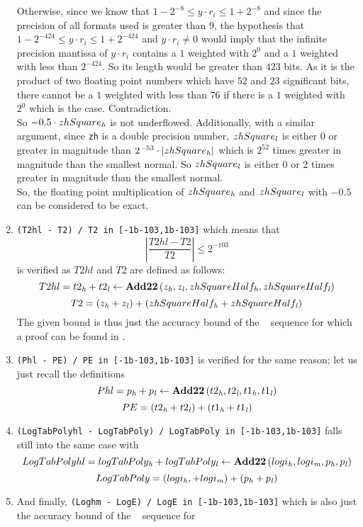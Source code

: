 \begin{enumerate}
Otherwise, since we know that $1 - 2^{-8} \leq y \cdot r_i \leq 1 + 2^{-8}$ and since the precision of all formats used is greater than 
$9$, the hypothesis that $1 - 2^{-424} \leq y \cdot r_i \leq 1 + 2^{-424}$ and $y \cdot r_i \not = 0$ 
would imply that the infinite precision mantissa of 
$y \cdot r_i$ contains a $1$ weighted with $2^0$ and a $1$ weighted with less than $2^{-424}$. So its length would be greater than
$423$ bits. As it is the product of two floating point numbers which have $52$ and $23$ significant bits, there
cannot be a $1$ weighted with less than $76$ if there is a $1$ weighted with $2^0$ which is the case. Contradiction. \\
So $-0.5 \cdot zhSquare_{\mathit{h}}$ is not underflowed. Additionally, with a similar argument, since {\tt zh} is a double precision
number, $zhSquare_{\mathit{l}}$ is either $0$ or greater in magnitude than $2^{-53} \cdot \left \vert zhSquare_{\mathit{h}} \right \vert$ which is
$2^{52}$ times greater in magnitude than the smallest normal. So $zhSquare_{\mathit{l}}$ is either $0$ or $2$ times greater in
magnitude than the smallest normal. \\
So, the floating point multiplication of $zhSquare_{\mathit{h}}$ and $zhSquare_{\mathit{l}}$ with $-0.5$ can be considered to be exact.
\item {\tt (T2hl - T2) / T2 in [-1b-103,1b-103]} which means that 
$$\left \vert \frac{T2hl - T2}{T2} \right \vert \leq 2^{-103}$$ is verified as $T2hl$ and $T2$ are defined as follows:
$$T2hl = t2_{\mathit{h}} + t2_{\mathit{l}} \gets \mathbf{Add22} \left( z_{\mathit{h}}, z_{\mathit{l}}, zhSquareHalf_{\mathit{h}}, zhSquareHalf_{\mathit{l}} \right)$$
$$T2 = \left( z_{\mathit{h}} + z_{\mathit{l}} \right) + \left( zhSquareHalf_{\mathit{h}} + zhSquareHalf_{\mathit{l}} \right)$$
The given bound is thus just the accuracy bound of the \AddDD~ sequence for which a proof can be found in 
\cite{Lau05}.
\item {\tt (Phl - PE) / PE in [-1b-103,1b-103]} is verified for the same reason; let us just recall the definitions
$$Phl = p_{\mathit{h}} + p_{\mathit{l}} \gets \mathbf{Add22} \left( t2_{\mathit{h}}, t2_{\mathit{l}}, t1_{\mathit{h}}, t1_{\mathit{l}} \right)$$
$$PE = \left( t2_{\mathit{h}} + t2_{\mathit{l}}\right) + \left( t1_{\mathit{h}} + t1_{\mathit{l}} \right)$$
\item {\tt (LogTabPolyhl - LogTabPoly) / LogTabPoly in [-1b-103,1b-103]} falls still into the same case with
$$LogTabPolyhl = logTabPoly_{\mathit{h}} + logTabPoly_{\mathit{l}} \gets \mathbf{Add22} \left( logi_{\mathit{h}}, logi_{\mathit{m}}, p_{\mathit{h}}, p_{\mathit{l}} \right)$$
$$LogTabPoly = \left( logi_{\mathit{h}}, + logi_{\mathit{m}} \right) + \left( p_{\mathit{h}} +  p_{\mathit{l}} \right)$$
\item And finally, {\tt (Loghm - LogE) / LogE in [-1b-103,1b-103]}
which is also just the accuracy bound of the \AddDD~ sequence for 

\end{enumerate}

